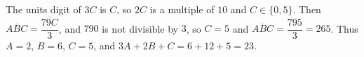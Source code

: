 The units digit of $3C$ is $C$, so $2C$ is a multiple of $10$ and $C\in\{0,5\}$. Then $\overline{ABC}=\dfrac{\overline{79C}}{3}$, and $790$ is not divisible by $3$, so $C=5$ and $\overline{ABC}=\dfrac{795}{3}=265$. Thus $A=2$, $B=6$, $C=5$, and $3A+2B+C=6+12+5=\boxed{23}$.
